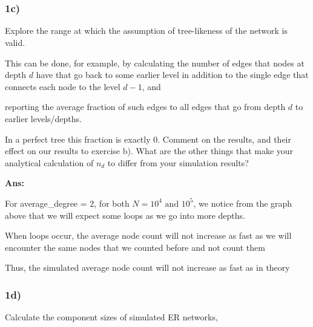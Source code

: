 \documentclass[11pt]{article}
\begin{document}
    \begin{center}
    \end{center}
    { \hspace*{\fill} \\}
    
    \begin{center}
    \end{center}
    { \hspace*{\fill} \\}
    
    \subsubsection{1c)}\label{c}

Explore the range at which the assumption of tree-likeness of the
network is valid.

This can be done, for example, by calculating the number of edges that
nodes at depth \(d\) have that go back to some earlier level in addition
to the single edge that connects each node to the level \(d − 1\), and

reporting the average fraction of such edges to all edges that go from
depth \(d\) to earlier levels/depths.

In a perfect tree this fraction is exactly 0. Comment on the results,
and their effect on our results to exercise b). What are the other
things that make your analytical calculation of \(n_d\) to differ from
your simulation results?

    \textbf{Ans:}

For average\_degree = 2, for both \(N = 10^4 \text{ and } 10^5\), we
notice from the graph above that we will expect some loops as we go into
more depths.

When loops occur, the average node count will not increase as fast as we
will encounter the same nodes that we counted before and not count them

Thus, the simulated average node count will not increase as fast as in
theory

    \subsubsection{1d)}\label{d}

Calculate the component sizes of simulated ER networks,
\end{document}

